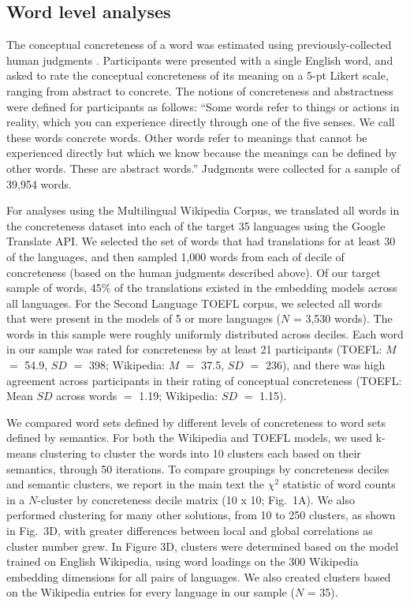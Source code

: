 \documentclass[9pt,twocolumn,twoside,lineno]{pnas-new}
\begin{document}
{\subsection*{Word level analyses}

The conceptual concreteness of a word was estimated using previously-collected human judgments \cite{brysbaert2014concreteness}. Participants were presented with a single English word, and asked to rate the conceptual concreteness of its meaning on a 5-pt Likert scale, ranging from abstract to concrete.  The notions of concreteness and abstractness were defined for participants as follows: ``Some words refer to things or actions in reality, which you can experience directly through one of the five senses. We call these words concrete words. Other words refer to meanings that cannot be experienced directly but which we know because the meanings can be defined by other words. These are abstract words.'' Judgments were collected for a sample of 39,954 words.

For analyses using the Multilingual Wikipedia Corpus, we translated all words in the concreteness dataset into each of the target 35 languages using the Google Translate API. We selected the set of words that had translations for at least 30 of the languages, and then sampled 1,000 words from each of decile of concreteness (based on the human judgments described above). Of our target sample of words, 45\% of the translations existed in the embedding models across all languages.  For the Second Language TOEFL corpus, we selected all words that were present in the models of 5 or more languages ($N$ = 3,530 words). The words in this sample were roughly uniformly distributed across deciles.  Each word in our sample was rated for concreteness by at least 21 participants (TOEFL:  $M$  $=$ 54.9, $SD$ $=$  398; Wikipedia:  $M$  $=$ 37.5, $SD$ $=$ 236), and there was high agreement across participants in their rating of conceptual concreteness  (TOEFL: Mean $SD$ across words $=$  1.19; Wikipedia:  $SD$ $=$ 1.15).
 
 We compared word sets defined by different levels of concreteness to word sets defined by semantics. For both the Wikipedia and TOEFL models, we used k-means clustering \cite{hartigan1979algorithm} to cluster the words into 10 clusters each based on their semantics, through 50 iterations. To compare groupings by concreteness deciles and semantic clusters, we report in the main text the $\chi^2$ statistic of word counts in a $N$-cluster by concreteness decile matrix  (10 x 10; Fig.\ 1A). We also performed clustering for many other solutions, from 10 to 250 clusters, as shown in Fig.\ 3D, with greater differences between local and global correlations as cluster number grew. In Figure 3D, clusters were determined based on the model trained on English Wikipedia, using word loadings on the 300 Wikipedia embedding dimensions for all pairs of languages. We also created clusters based on the Wikipedia entries for every language in our sample ($N$ = 35).
 
}
\end{document}
